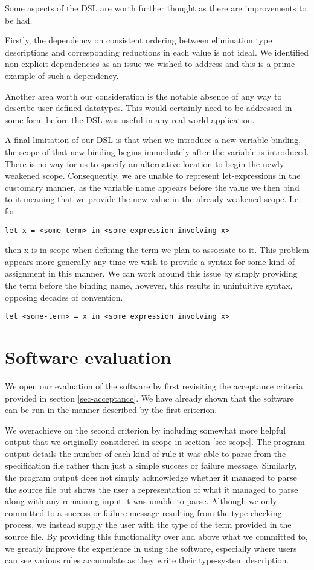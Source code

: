 Some aspects of the DSL are worth further thought as there are
improvements to be had.

Firstly, the dependency on consistent ordering between elimination
type descriptions and corresponding reductions in each value is not
ideal. We identified non-explicit dependencies as an issue we wished to
address and this is a prime example of such a dependency.

Another area worth our consideration is the notable absence of any way to
describe user-defined datatypes. This would certainly need to be addressed
in some form before the DSL was useful in any real-world application.

A final limitation of our DSL is that when we introduce a new variable
binding, the scope of that new binding begins immediately after the
variable is introduced. There is no way for us to specify an
alternative location to begin the newly weakened scope. Consequently,
we are unable to represent let-expressions in the customary manner, as
the variable name appears before the value we then bind to it meaning
that we provide the new value in the already weakened scope. I.e. for
\begin{verbatim}
let x = <some-term> in <some expression involving x>
\end{verbatim}
then x is in-scope when defining the term we plan to associate to
it. This problem appears more generally any time we wish to provide a
syntax for some kind of assignment in this manner. We can work around
this issue by simply providing the term before the binding name,
however, this results in unintuitive syntax, opposing decades of
convention.
\begin{verbatim}
let <some-term> = x in <some expression involving x>
\end{verbatim}
\section{Software evaluation}
We open our evaluation of the software by first revisiting the
acceptance criteria provided in section \ref{sec-acceptance}. We have
already shown that the software can be run in the manner described by
the first criterion.

We overachieve on the second criterion by including somewhat more
helpful output that we originally considered in-scope in section
\ref{sec-scope}. The program output details the number of each kind of
rule it was able to parse from the specification file rather than just
a simple success or failure message. Similarly, the program output does
not simply acknowledge whether it managed to parse the source file
but shows the user a representation of what it managed to parse along
with any remaining input it was unable to parse. Although we
only committed to a success or failure message resulting from the
type-checking process, we instead supply the user with the type of the
term provided in the source file. By providing this functionality over
and above what we committed to, we greatly improve the experience in
using the software, especially where users can see various
rules accumulate as they write their type-system description.

